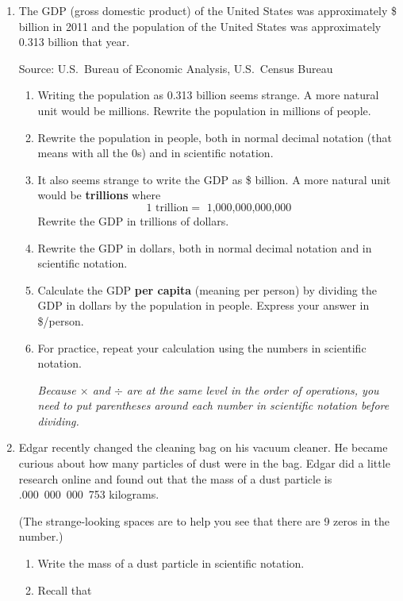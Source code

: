 \begin{enumerate}

\item The GDP (gross domestic product) of the United States was approximately \$ billion in 2011 and the population of the United States was approximately 0.313 billion that year.  \hfill \begin{footnotesize} Source:  U.S.\ Bureau of Economic Analysis, U.S.\ Census Bureau\end{footnotesize}
\begin{enumerate}
\item Writing the population as 0.313 billion seems strange.  A more natural unit would be millions.  Rewrite the population in millions of people. \vfill
\item Rewrite the population in people, both in normal decimal notation (that means with all the 0s) and in scientific notation. \vfill
\item It also seems strange to write the GDP as \$ billion.   A more natural unit would be \textbf{trillions} where
$$1 \text{ trillion} =  \text{ 1,000,000,000,000}$$
Rewrite the GDP in trillions of dollars. \vfill
\item Rewrite the GDP in dollars, both in normal decimal notation and in scientific notation. \vfill
\item Calculate the GDP \textbf{per capita} (meaning per person) by dividing the GDP in dollars by the population in people.  Express your answer in \$/person. \vfill
\item For practice, repeat your calculation using the numbers in scientific notation.  
 
 \emph{Because $\times$ and $\div$ are at the same level in the order of operations, you need to put parentheses around each number in scientific notation before dividing.} \vfill
\end{enumerate}

\newpage %

\item Edgar recently changed the cleaning bag on his vacuum cleaner.  He became curious about how many particles of dust were in the bag.  Edgar did a little research online and found out that the mass of a dust particle is .000~000~000~753 kilograms.  

(The strange-looking spaces are to help you see that there are 9 zeros in the number.)
\begin{enumerate}
\item Write the mass of a dust particle in scientific notation. \vfill
\item Recall that 


\end{enumerate}
\end{enumerate}
